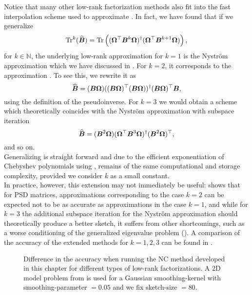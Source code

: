 Notice that many other low-rank factorization methods \cite{halko2011finding,tropp2023randomized}
also fit into the fast interpolation scheme used to approximate .
In fact, we have found that if we generalize
\begin{equation}
    \operatorname{Tr}^{k}(\widehat{\boldsymbol{B}})
        = \operatorname{Tr}\left((\boldsymbol{\Omega}^{\top} \boldsymbol{B}^k \boldsymbol{\Omega})^{\dagger} (\boldsymbol{\Omega}^{\top} \boldsymbol{B}^{k+1} \boldsymbol{\Omega}) \right),
    \label{equ:3-nystrom-trace-generalization}
\end{equation}
for $k \in \mathbb{N}$,
the underlying low-rank approximation for $k=1$ is the Nystr\"om approximation
which we have discussed in .
For $k=2$, it corresponds to the approximation .
To see this, we rewrite it as
\begin{equation}
    \widehat{\boldsymbol{B}} = (\boldsymbol{B} \boldsymbol{\Omega}) ((\boldsymbol{B} \boldsymbol{\Omega})^{\top} (\boldsymbol{B} \boldsymbol{\Omega}))^{\dagger} (\boldsymbol{B} \boldsymbol{\Omega})^{\top} \boldsymbol{B},
    \label{equ:3-nystrom-RSVD-rewritten}
\end{equation}
using the definition of the pseudoinverse.
For $k=3$ we would obtain a scheme which theoretically coincides with the Nystr\"om
approximation with subspace iteration \cite{tropp2023randomized}
\begin{equation}
    \widehat{\boldsymbol{B}} = (\boldsymbol{B}^2 \boldsymbol{\Omega}) (\boldsymbol{\Omega}^{\top} \boldsymbol{B}^3 \boldsymbol{\Omega})^{\dagger} (\boldsymbol{B}^2 \boldsymbol{\Omega})^{\top},
    \label{equ:3-nystrom-nystrom-SI}
\end{equation}
and so on.\\

Generalizing  is straight forward and
due to the efficient exponentiation of Chebyshev polynomials using
, remains of the same
computational and storage complexity, provided we consider $k$ as a small constant.\\

In practice, however, this extension may not immediately be useful: \cite[lemma~5.2]{tropp2023randomized}
shows that for \gls{PSD} matrices, approximations corresponding to the case $k=2$
can be expected not to be as accurate as approximations in the case $k=1$, and
while for $k=3$ the additional subspace iteration for the Nystr\"om approximation
should theoretically produce a better sketch, it suffers from other shortcomings,
such as a worse conditioning of the generalized eigenvalue problem ().
A comparison of the accuracy of the extended methods for $k=1, 2, 3$ can be
found in .

\begin{figure}[ht]
    \centering
    
    \caption{Difference in the accuracy when running the \gls{NC} method developed in this
    chapter for different types of low-rank factorizations.
    A 2D model problem from 
    is used for a Gaussian \gls{smoothing-kernel} with \gls{smoothing-parameter} $=0.05$
    and we fix \gls{sketch-size} $=80$.}
    \label{fig:3-nystrom-other-approximations}
\end{figure}
